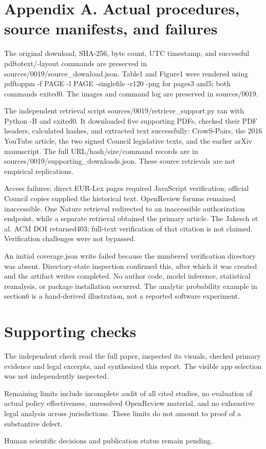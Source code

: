 \documentclass[10pt]{article}
\begin{document}
\section*{Appendix A. Actual procedures, source manifests, and failures}
The original download, SHA-256, byte count, UTC timestamp, and successful pdftotext/-layout commands are preserved in sources/0019/source\_download.json. Table1 and Figure1 were rendered using pdftoppm -f PAGE -l PAGE -singlefile -r120 -png for pages3 and5; both commands exited0. The images and command log are preserved in sources/0019.\par
The independent retrieval script sources/0019/retrieve\_support.py ran with Python -B and exited0. It downloaded five supporting PDFs, checked their PDF headers, calculated hashes, and extracted text successfully: CrowS-Pairs, the 2016 YouTube article, the two signed Council legislative texts, and the earlier arXiv manuscript. The full URL/hash/size/command records are in sources/0019/supporting\_downloads.json. These source retrievals are not empirical replications.\par
Access failures: direct EUR-Lex pages required JavaScript verification; official Council copies supplied the historical text. OpenReview forums remained inaccessible. One Nature retrieval redirected to an inaccessible authorization endpoint, while a separate retrieval obtained the primary article. The Jakesch et al. ACM DOI returned403; full-text verification of that citation is not claimed. Verification challenges were not bypassed.\par
An initial coverage.json write failed because the numbered verification directory was absent. Directory-state inspection confirmed this, after which it was created and the artifact writes completed. No author code, model inference, statistical reanalysis, or package installation occurred. The analytic probability example in section6 is a hand-derived illustration, not a reported software experiment.\par
\section*{Supporting checks}
The independent check read the full paper, inspected its visuals, checked primary evidence and legal excerpts, and synthesized this report. The visible app selection was not independently inspected.\par
Remaining limits include incomplete audit of all cited studies, no evaluation of actual policy effectiveness, unresolved OpenReview material, and no exhaustive legal analysis across jurisdictions. These limits do not amount to proof of a substantive defect.\par
Human scientific decisions and publication status remain pending.\par
\end{document}
